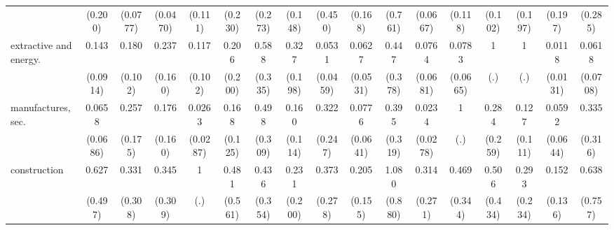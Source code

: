 {\begin{tabular}{l*{16}{c}}
                    &     (0.200)         &    (0.0777)         &    (0.0470)         &     (0.111)         &     (0.230)         &     (0.273)         &     (0.148)         &     (0.450)         &     (0.168)         &     (0.761)         &    (0.0667)         &     (0.118)         &     (0.102)         &     (0.197)         &     (0.197)         &     (0.285)         \\
[1em]
extractive and energy.&       0.143\sym{**} &       0.180\sym{**} &       0.237\sym{*}  &       0.117\sym{*}  &       0.206         &       0.588         &       0.327         &      0.0531\sym{***}&      0.0627\sym{**} &       0.447         &      0.0764\sym{**} &      0.0783\sym{**} &           1         &           1         &      0.0118\sym{***}&      0.0618\sym{*}  \\
                    &    (0.0914)         &     (0.102)         &     (0.160)         &     (0.102)         &     (0.200)         &     (0.335)         &     (0.198)         &    (0.0459)         &    (0.0531)         &     (0.378)         &    (0.0681)         &    (0.0665)         &         (.)         &         (.)         &    (0.0131)         &    (0.0708)         \\
[1em]
manufactures, sec.  &      0.0658\sym{**} &       0.257\sym{*}  &       0.176         &      0.0263\sym{***}&       0.168\sym{*}  &       0.498         &       0.160\sym{*}  &       0.322         &      0.0776\sym{**} &       0.395         &      0.0234\sym{**} &           1         &       0.284         &       0.127\sym{*}  &      0.0592\sym{**} &       0.335         \\
                    &    (0.0686)         &     (0.175)         &     (0.160)         &    (0.0287)         &     (0.125)         &     (0.309)         &     (0.114)         &     (0.247)         &    (0.0641)         &     (0.319)         &    (0.0278)         &         (.)         &     (0.259)         &     (0.111)         &    (0.0644)         &     (0.316)         \\
[1em]
construction        &       0.627         &       0.331         &       0.345         &           1         &       0.481         &       0.436         &       0.231         &       0.373         &       0.205\sym{*}  &       1.080         &       0.314         &       0.469         &       0.506         &       0.293         &       0.152\sym{*}  &       0.638         \\
                    &     (0.497)         &     (0.308)         &     (0.309)         &         (.)         &     (0.561)         &     (0.354)         &     (0.200)         &     (0.278)         &     (0.155)         &     (0.880)         &     (0.271)         &     (0.344)         &     (0.434)         &     (0.234)         &     (0.136)         &     (0.757)         \\

\end{tabular}}
